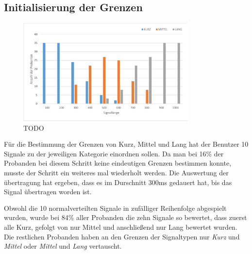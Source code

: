 \subsection{Initialisierung der Grenzen}
\label{ch:Evolution{\"a}rer Algorithmus:sec:Studiendesign}

\begin{figure}[htbp] 
            \centering
   	\includegraphics[width=0.8\textwidth]{pics/analyse/Initialisierung.png}
	\caption{TODO}
	\label{fig:Initialisierung}
\end{figure}

F{\"u}r die Bestimmung der Grenzen von Kurz, Mittel und Lang hat der Benutzer 10 Signale zu der jeweiligen Kategorie einordnen sollen. 
Da man bei 16\% der Probanden bei diesem Schritt keine eindeutigen Grenzen bestimmen konnte, musste der Schritt ein weiteres mal wiederholt werden. Die Auswertung der {\"u}bertragung hat ergeben, dass es im Durschnitt 300ms gedauert hat, bis das Signal {\"u}bertragen worden ist.

Obwohl die 10 normalverteilten Signale in zuf{\"a}lliger Reihenfolge abgespielt wurden, wurde bei 84\% aller Probanden die zehn Signale so bewertet, dass zuerst alle Kurz, gefolgt von nur Mittel und anschlie{\ss}end nur Lang bewertet wurden. 
Die restlichen Probanden haben an den Grenzen der Signaltypen nur \textit{Kurz} und \textit{Mittel} oder \textit{Mittel} und \textit{Lang} vertauscht.


